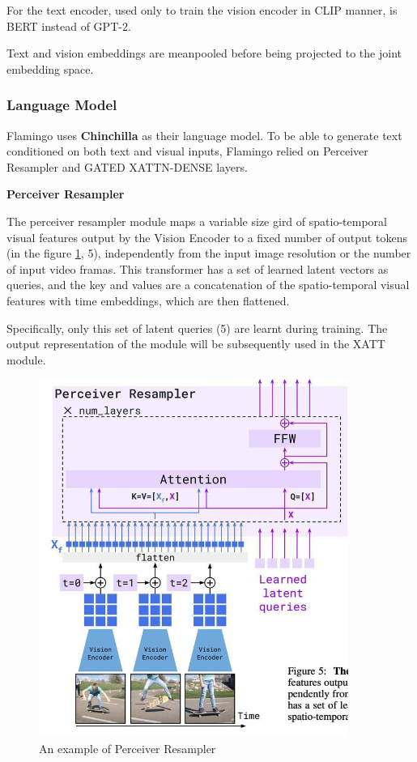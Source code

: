For the text encoder, used only to train the vision encoder in CLIP manner, is BERT instead of GPT-2.

Text and vision embeddings are meanpooled before being projected to the joint embedding space.

\subsubsection{Language Model}

Flamingo uses \textbf{Chinchilla} as their language model. To be able to generate text conditioned on both text and visual inputs, Flamingo relied on Perceiver Resampler and GATED XATTN-DENSE layers.

\textbf{Perceiver Resampler}

The perceiver resampler module maps a variable size gird of spatio-temporal visual features output by the Vision Encoder to a fixed number of output tokens (in the figure \ref{fig:Perceiver-resampler}, 5), independently from the input image resolution or the number of input video framas. This transformer has a set of learned latent vectors as queries, and the key and values are a concatenation of the spatio-temporal visual features with time embeddings, which are then flattened.

Specifically, only this set of latent queries (5) are learnt during training. The output representation of the module will be subsequently used in the XATT module.


\begin{figure}[H]
    \centering
    \includegraphics[width=1\linewidth]{tikz/Perceiver Resampler.png}
    \caption{An example of Perceiver Resampler}
    \label{fig:Perceiver-resampler}
\end{figure}

